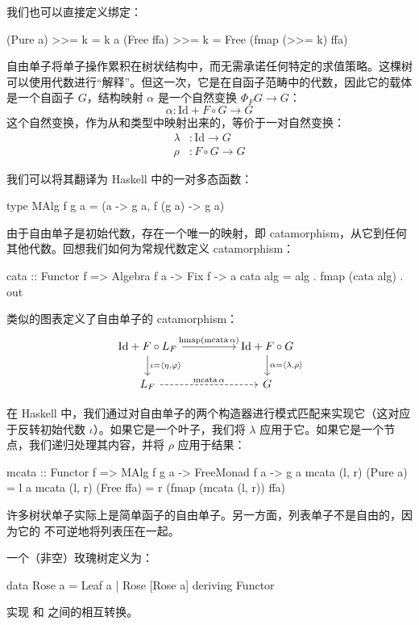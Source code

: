 \documentclass[DaoFP]{subfiles}
\begin{document}
我们也可以直接定义绑定：
\begin{haskell}
  (Pure a)   >>= k = k a
  (Free ffa) >>= k = Free (fmap (>>= k) ffa)
\end{haskell}

自由单子将单子操作累积在树状结构中，而无需承诺任何特定的求值策略。这棵树可以使用代数进行“解释”。但这一次，它是在自函子范畴中的代数，因此它的载体是一个自函子 $G$，结构映射 $\alpha$ 是一个自然变换 $\Phi_F G \to G$：
\[ \alpha \colon \text{Id} + F \circ G \to G\]
这个自然变换，作为从和类型中映射出来的，等价于一对自然变换：
\begin{align*}
\lambda &\colon \text{Id} \to G
\\
\rho &\colon F \circ G \to G
\end{align*}

我们可以将其翻译为 Haskell 中的一对多态函数：
\begin{haskell}
type MAlg f g a = (a -> g a, f (g a) -> g a)
\end{haskell}

由于自由单子是初始代数，存在一个唯一的映射，即 catamorphism，从它到任何其他代数。回想我们如何为常规代数定义 catamorphism：
\begin{haskell}
cata :: Functor f => Algebra f a -> Fix f -> a
cata alg = alg . fmap (cata alg) . out
\end{haskell}

类似的图表定义了自由单子的 catamorphism：
\[
 \begin{tikzcd}
 \text{Id} + F \circ L_F
 \arrow[rr, "{\text{hmap} (\text{mcata}\, \alpha)}"]
 \arrow[d, "{\iota = \langle \eta, \varphi \rangle}"]
 && \text{Id} + F \circ G
\arrow[d, "{\alpha = \langle \lambda, \rho \rangle}"]
 \\
 L_F
 \arrow[rr, dashed, "\text{mcata}\, \alpha"]
 && G
  \end{tikzcd}
\]

在 Haskell 中，我们通过对自由单子的两个构造器进行模式匹配来实现它（这对应于反转初始代数 $\iota$）。如果它是一个叶子，我们将 $\lambda$ 应用于它。如果它是一个节点，我们递归处理其内容，并将 $\rho$ 应用于结果：
\begin{haskell}
mcata :: Functor f => MAlg f g a -> FreeMonad f a -> g a
mcata (l, r) (Pure a) = l a
mcata (l, r) (Free ffa) = 
  r (fmap (mcata (l, r)) ffa)
\end{haskell}

许多树状单子实际上是简单函子的自由单子。另一方面，列表单子不是自由的，因为它的  不可逆地将列表压在一起。

\begin{exercise}
一个（非空）玫瑰树定义为：
\begin{haskell}
data Rose a = Leaf a | Rose [Rose a]
  deriving Functor
\end{haskell}
实现  和  之间的相互转换。
\end{exercise}
\end{document}
